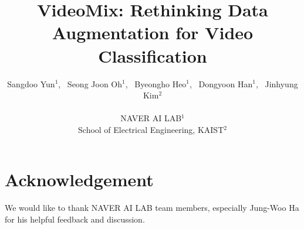 \documentclass[final]{cvpr}
\begin{document}
\title{
VideoMix: Rethinking Data Augmentation for Video Classification
}


\author{
Sangdoo Yun$^1$, 
~Seong Joon Oh$^1$,
~Byeongho Heo$^1$, 
~Dongyoon Han$^1$, 
~Jinhyung Kim$^2$ \\ 
~ \\
NAVER AI LAB$^1$ \\
School of Electrical Engineering, KAIST$^2$ 
}

\maketitle








{\small
\section*{Acknowledgement}
We would like to thank NAVER AI LAB team members, especially Jung-Woo Ha for his helpful feedback and discussion.
}



{\small


}

\clearpage

\appendix







\end{document}
